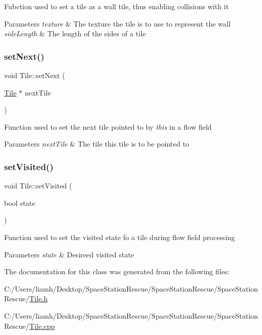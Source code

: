 Fubction used to set a tile as a wall tile, thus enabling collisions with it 


\begin{DoxyParams}{Parameters}
{\em texture} & The texture the tile is to use to represent the wall\\
\hline
{\em side\+Length} & The length of the sides of a tile\\
\hline
\end{DoxyParams}
\mbox{\label{class_tile_aaac2503794e22ce2fb2911dc1951b87f}} 
\subsubsection{\texorpdfstring{setNext()}{setNext()}}
{\footnotesize\ttfamily void Tile\+::set\+Next (\begin{DoxyParamCaption}\item[{\mbox{\hyperlink{class_tile}{Tile}} $\ast$}]{next\+Tile }\end{DoxyParamCaption})}



Function used to set the next tile pointed to by {\itshape this} in a flow field 


\begin{DoxyParams}{Parameters}
{\em next\+Tile} & The tile this tile is to be pointed to\\
\hline
\end{DoxyParams}
\mbox{\label{class_tile_a9df4805affe8338658a3cfb683a38d20}} 
\subsubsection{\texorpdfstring{setVisited()}{setVisited()}}
{\footnotesize\ttfamily void Tile\+::set\+Visited (\begin{DoxyParamCaption}\item[{bool}]{state }\end{DoxyParamCaption})}



Function used to set the visited state fo a tile during flow field processing 


\begin{DoxyParams}{Parameters}
{\em state} & Desireed visited state\\
\hline
\end{DoxyParams}


The documentation for this class was generated from the following files\+:\begin{DoxyCompactItemize}
\item 
C\+:/\+Users/liamh/\+Desktop/\+Space\+Station\+Rescue/\+Space\+Station\+Rescue/\+Space\+Station\+Rescue/\mbox{\hyperlink{_tile_8h}{Tile.\+h}}\item 
C\+:/\+Users/liamh/\+Desktop/\+Space\+Station\+Rescue/\+Space\+Station\+Rescue/\+Space\+Station\+Rescue/\mbox{\hyperlink{_tile_8cpp}{Tile.\+cpp}}\end{DoxyCompactItemize}
